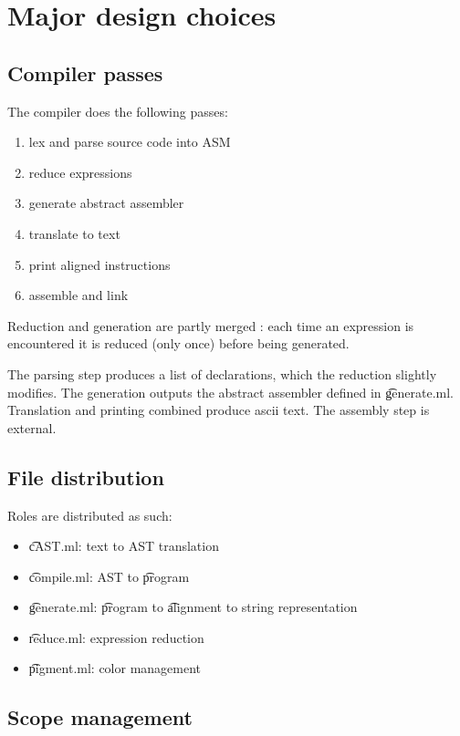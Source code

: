 \section{Major design choices}

\subsection{Compiler passes}

The compiler does the following passes:
\begin{enumerate}
    \item lex and parse source code into ASM
    \item reduce expressions
    \item generate abstract assembler
    \item translate to text
    \item print aligned instructions
    \item assemble and link
\end{enumerate}

Reduction and generation are partly merged : each time an expression is encountered it is reduced (only once) before being generated.

The parsing step produces a list of declarations, which the reduction slightly modifies. The generation outputs the abstract assembler defined in \t{generate.ml}. Translation and printing combined produce ascii text. The assembly step is external.

\subsection{File distribution}

Roles are distributed as such:
\begin{itemize}
    \item \t{cAST.ml}: text to AST translation
    \item \t{compile.ml}: AST to \t{program}
    \item \t{generate.ml}: \t{program} to \t{alignment} to string representation
    \item \t{reduce.ml}: expression reduction
    \item \t{pigment.ml}: color management
\end{itemize}

\subsection{Scope management}

